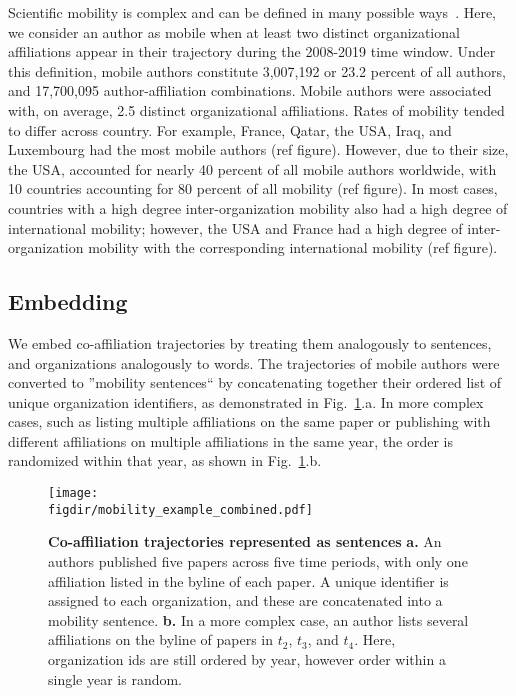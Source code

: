 \documentclass[12pt]{article} %
\def\figdir{../Figs}
\begin{document}
Scientific mobility is complex and can be defined in many possible ways~\cite{robinson2019mobility}.
Here, we consider an author as mobile when at least two distinct organizational affiliations appear in their trajectory during the 2008-2019 time window. 
Under this definition, mobile authors constitute 3,007,192 or 23.2 percent of all authors, and 17,700,095 author-affiliation combinations. 
Mobile authors were associated with, on average, 2.5 distinct organizational affiliations. 
Rates of mobility tended to differ across country. 
For example, France, Qatar, the USA, Iraq, and Luxembourg had the most mobile authors (ref figure).
However, due to their size, the USA, accounted for nearly 40 percent of all mobile authors worldwide, with  10 countries accounting for 80 percent of all mobility (ref figure).
In most cases, countries with a high degree inter-organization mobility also had a high degree of international mobility;
however, the USA and France had a high degree of inter-organization mobility with the corresponding international mobility (ref figure). 


\subsection*{Embedding}
We embed co-affiliation trajectories by treating them analogously to sentences, and organizations analogously to words. 
The trajectories of mobile authors were converted to ''mobility sentences`` by concatenating together their ordered list of unique organization identifiers, as demonstrated in Fig.~\ref{fig:methods:mobility_sentence}.a.
In more complex cases, such as listing multiple affiliations on the same paper or publishing with different affiliations on multiple affiliations in the same year, the order is randomized within that year, as shown in  Fig.~\ref{fig:methods:mobility_sentence}.b. 

%
%
\begin{figure}[ht!]
	\centering
	\label{fig:methods:mobility_sentence}
	\texttt{[image: \\figdir/mobility\_example\_combined.pdf]}
	\caption{
		\textbf{Co-affiliation trajectories represented as sentences}
		\textbf{a.} 
		An authors published five papers across five time periods, with only one affiliation listed in the byline of each paper. 
		A unique identifier is assigned to each organization, and these are concatenated into a mobility sentence. 
		\textbf{b.}
		In a more complex case, an author lists several affiliations on the byline of papers in $t_{2}$, $t_{3}$, and $t_{4}$. Here, organization ids are still ordered by year, however order within a single year is random.  	
	}
\end{figure}
\end{document}
